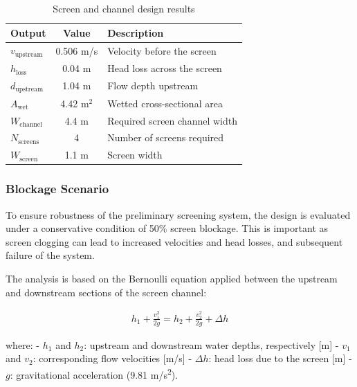 \documentclass[11pt]{article}
\begin{document}
\begin{table}[h]
\centering
\caption{Screen and channel design results}
\label{tab:screen_outputs}
\begin{tabular}{|l|c|l|}
\hline
\textbf{Output} & \textbf{Value} & \textbf{Description} \\
\hline
$v_{\text{upstream}}$ & 
0.506
 m/s
& Velocity before the screen \\
$h_{\text{loss}}$ & 
0.04
 m
& Head loss across the screen \\
$d_{\text{upstream}}$ & 
1.04
m & Flow depth upstream \\
$A_{\text{wet}}$ & 
4.42
m$^2$ & Wetted cross-sectional area \\
$W_{\text{channel}}$ & 
4.4
m & Required screen channel width \\
$N_{\text{screens}}$ & 
4
& Number of screens required \\
$W_{\text{screen}}$ &
1.1
m & Screen width\\
\hline
\end{tabular}
\end{table}


\subsubsection{Blockage Scenario}
\label{sec:screening_blockage}

To ensure robustness of the preliminary screening system, 
the design is evaluated under a conservative condition of 
50\% screen blockage. This is important as screen 
clogging can lead to increased velocities and head losses, and 
subsequent failure of the system.

The analysis is based on the Bernoulli equation applied between 
the upstream and downstream sections of the screen channel:

\begin{align}
h_1 + \frac{v_1^2}{2g} = h_2 + \frac{v_2^2}{2g} + \Delta h
\label{eq:bernoulli_basic}
\end{align}

where:
- \( h_1 \) and \( h_2 \): upstream and downstream water depths, respectively [m]
- \( v_1 \) and \( v_2 \): corresponding flow velocities [m/s]
- \( \Delta h \): head loss due to the screen [m]
- \( g \): gravitational acceleration (9.81 m/s\textsuperscript{2}).
\end{document}
